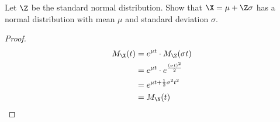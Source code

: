 Let $\Z$ be the standard normal distribution. Show that $\X = \mu + \Z\sigma$ has a normal
distribution with mean $\mu$ and standard deviation $\sigma$.

\begin{proof}
\begin{align*}
M_{\X}(t) & = e^{\mu t} \cdot M_{\Z}(\sigma t) \\
& = e^{\mu t} \cdot e^{\frac{(\sigma t)^2}{2}} \\
& = e^{\mu t + \frac{1}{2}\sigma^2t^2} \\
& = M_{\N}(t)
\end{align*}
\end{proof}
